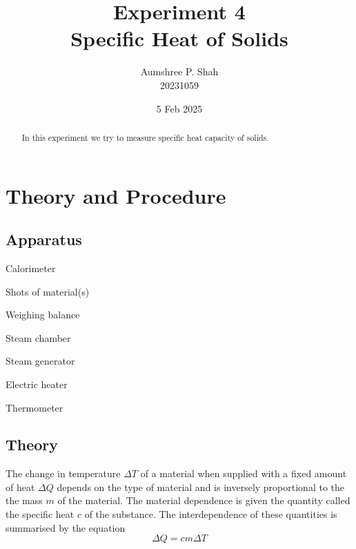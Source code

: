 \documentclass[%
 sor,
 jor,
 amsmath,amssymb,
 reprint,%
]{revtex4-2}
\begin{document}

\title{Experiment 4\\Specific Heat of Solids}

\author{Aumshree P. Shah\\20231059\color{red}}
\altaffiliation[\color{red}]{aumshree.pinkalbenshah@students.iiserpune.ac.in}
\date{5 Feb 2025}
\vspace{1cm}
\begin{abstract}
\centering
In this experiment we try to measure specific heat capacity of solids.
\end{abstract}
\maketitle
\section{Theory and Procedure}
\subsection{Apparatus}

{\small
\begin{itemize}
\begin{minipage}[t]{0.45\textwidth}
    \item Calorimeter
    \item Shots of material(s)
    \item Weighing balance
    \item Steam chamber
\end{minipage}
\hfill
\begin{minipage}[t]{0.45\textwidth}
    \item Steam generator
    \item Electric heater
    \item Thermometer
\end{minipage}
\end{itemize}
}

\subsection{Theory}

The change in temperature $\Delta T$ of a material when supplied with a fixed amount of heat $\Delta Q$ depends
on the type of material and is inversely proportional to the the mass $m$ of the material. The material dependence
is given the quantity called the specific heat $c$ of the substance. The interdependence of these quantities is
summarised by the equation$$\Delta Q= cm \Delta T$$
\end{document}
